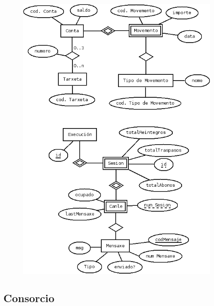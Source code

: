 \documentclass[a4paper,titlepage]{article}
\begin{document}
\begin{figure}[h!]
  \begin{center}
    \includegraphics[width=0.9\textwidth]{diagrama_bd_bancos.png}
  \end{center}
\end{figure}



\clearpage

\subsection {Consorcio}
\end{document}
